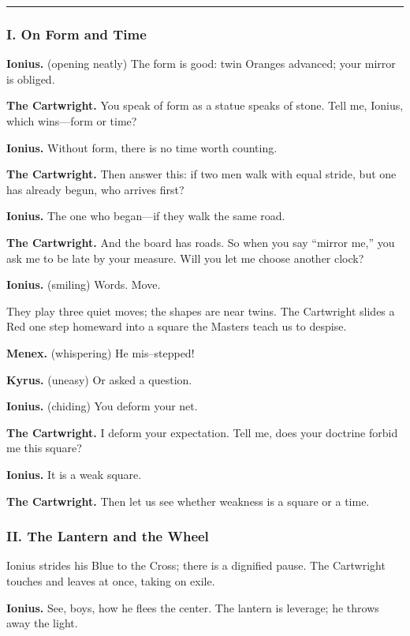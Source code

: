 \documentclass[11pt]{article}
\begin{document}
\medskip
\hrule
\medskip

\subsubsection*{I. On Form and Time}
\noindent\textbf{Ionius.} (opening neatly) The form is good: twin Oranges advanced; your mirror is obliged.

\noindent\textbf{The Cartwright.} You speak of form as a statue speaks of stone. Tell me, Ionius, which wins—form or time?

\noindent\textbf{Ionius.} Without form, there is no time worth counting.

\noindent\textbf{The Cartwright.} Then answer this: if two men walk with equal stride, but one has already begun, who arrives first?

\noindent\textbf{Ionius.} The one who began—if they walk the same road.

\noindent\textbf{The Cartwright.} And the board has roads. So when you say “mirror me,” you ask me to be late by your measure. Will you let me choose another clock?

\noindent\textbf{Ionius.} (smiling) Words. Move.

\medskip
They play three quiet moves; the shapes are near twins. The Cartwright slides a Red one step homeward into a square the Masters teach us to despise.

\noindent\textbf{Menex.} (whispering) He mis–stepped!

\noindent\textbf{Kyrus.} (uneasy) Or asked a question.

\noindent\textbf{Ionius.} (chiding) You deform your net.

\noindent\textbf{The Cartwright.} I deform your expectation. Tell me, does your doctrine forbid me this square?

\noindent\textbf{Ionius.} It is a weak square.

\noindent\textbf{The Cartwright.} Then let us see whether weakness is a square or a time.

\medskip
\subsubsection*{II. The Lantern and the Wheel}
Ionius strides his Blue to the Cross; there is a dignified pause. The Cartwright touches and leaves at once, taking on exile.

\noindent\textbf{Ionius.} See, boys, how he flees the center. The lantern is leverage; he throws away the light.
\end{document}
